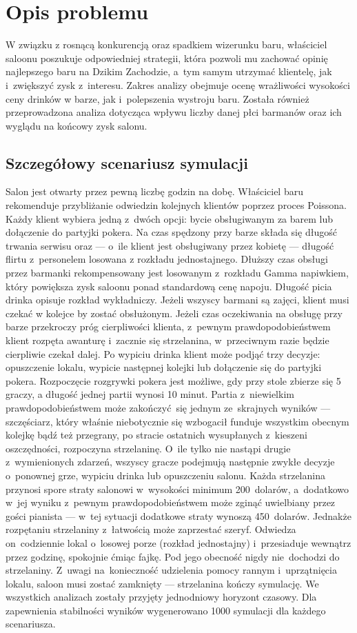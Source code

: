 \documentclass[12pt, a4paper, oneside]{mwart} %
\begin{document}
\section{Opis problemu}
W związku z rosnącą konkurencją oraz spadkiem wizerunku baru, właściciel saloonu poszukuje odpowiedniej strategii, która pozwoli mu zachować opinię najlepszego baru na Dzikim Zachodzie, a~tym samym utrzymać klientelę, jak i~zwiększyć zysk z~interesu. Zakres analizy obejmuje ocenę wrażliwości wysokości ceny drinków w barze, jak i~polepszenia wystroju baru. Została również przeprowadzona analiza dotycząca wpływu liczby danej płci barmanów oraz ich wyglądu na końcowy zysk salonu.

\subsection{Szczegółowy scenariusz symulacji}
Salon jest otwarty przez pewną liczbę godzin na dobę. Właściciel baru rekomenduje przybliżanie odwiedzin kolejnych klientów poprzez proces Poissona. Każdy klient wybiera jedną z~dwóch opcji: bycie obsługiwanym za barem lub dołączenie do partyjki pokera. Na czas spędzony przy barze składa się długość trwania serwisu oraz --- o~ile klient jest obsługiwany przez kobietę --- długość flirtu z~personelem losowana z rozkładu jednostajnego. Dłuższy czas obsługi przez barmanki rekompensowany jest losowanym z~rozkładu Gamma napiwkiem, który powiększa zysk saloonu ponad standardową cenę napoju. Długość picia drinka opisuje rozkład wykładniczy. Jeżeli wszyscy barmani są zajęci, klient musi czekać w kolejce by zostać obsłużonym. Jeżeli czas oczekiwania na obsługę przy barze przekroczy próg cierpliwości klienta, z~pewnym prawdopodobieństwem klient rozpęta awanturę i~zacznie się strzelanina, w~przeciwnym razie będzie cierpliwie czekał dalej. Po wypiciu drinka klient może podjąć trzy decyzje: opuszczenie lokalu, wypicie następnej kolejki lub dołączenie się do partyjki pokera. Rozpoczęcie rozgrywki pokera jest możliwe, gdy przy stole zbierze się 5 graczy, a długość jednej partii wynosi 10 minut. Partia z~niewielkim prawdopodobieństwem może zakończyć~się jednym ze~skrajnych wyników --- szczęściarz, który właśnie niebotycznie się wzbogacił funduje wszystkim obecnym kolejkę bądź też przegrany, po stracie ostatnich wysupłanych z~kieszeni oszczędności, rozpoczyna strzelaninę. O~ile tylko nie nastąpi drugie z~wymienionych zdarzeń, wszyscy gracze podejmują następnie zwykłe decyzje o~ponownej grze, wypiciu drinka lub opuszczeniu salonu. Każda strzelanina przynosi spore straty salonowi w~wysokości minimum 200~dolarów, a~dodatkowo w~jej wyniku z~pewnym prawdopodobieństwem może zginąć uwielbiany przez gości pianista --- w~tej sytuacji dodatkowe straty wynoszą 450~dolarów. Jednakże rozpętaniu strzelaniny z~łatwością może zaprzestać szeryf. Odwiedza on~codziennie lokal o~losowej porze (rozkład jednostajny) i~przesiaduje wewnątrz przez godzinę, spokojnie ćmiąc fajkę. Pod jego obecność nigdy nie~dochodzi do strzelaniny. Z~uwagi na~konieczność udzielenia pomocy rannym i~uprzątnięcia lokalu, saloon musi zostać zamknięty --- strzelanina kończy symulację. We wszystkich analizach zostały przyjęty jednodniowy horyzont czasowy. Dla zapewnienia stabilności wyników wygenerowano 1000 symulacji dla każdego scenariusza.
\end{document}

